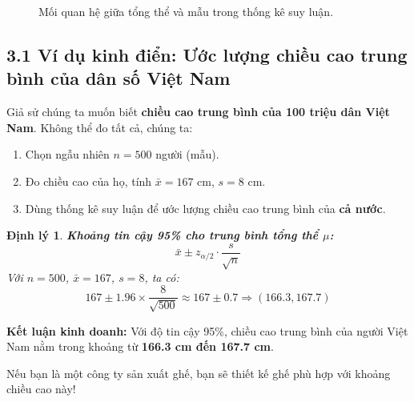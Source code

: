 \documentclass[a4paper,12pt]{article}
\newtheorem{theorem}{\color{theoremcolor}\bfseries Định lý}[section]
\theoremstyle{remark}
\begin{document}
\begin{figure}[H]
\centering
{}
\caption{Mối quan hệ giữa tổng thể và mẫu trong thống kê suy luận.}
\end{figure}

\subsection*{3.1 Ví dụ kinh điển: Ước lượng chiều cao trung bình của dân số Việt Nam}

Giả sử chúng ta muốn biết \textbf{chiều cao trung bình của 100 triệu dân Việt Nam}. Không thể đo tất cả, chúng ta:

\begin{enumerate}
    \item Chọn ngẫu nhiên \(n = 500\) người (mẫu).
    \item Đo chiều cao của họ, tính \(\bar{x} = 167\) cm, \(s = 8\) cm.
    \item Dùng thống kê suy luận để ước lượng chiều cao trung bình của \textbf{cả nước}.
\end{enumerate}

\begin{theorem}
\textbf{Khoảng tin cậy 95\% cho trung bình tổng thể \(\mu\):}
\[
\boxed{\bar{x} \pm z_{\alpha/2} \cdot \frac{s}{\sqrt{n}}}
\]
Với \(n = 500\), \(\bar{x} = 167\), \(s = 8\), ta có:
\[
167 \pm 1.96 \times \frac{8}{\sqrt{500}} \approx 167 \pm 0.7 \Rightarrow (166.3, 167.7)
\]
\end{theorem}

\begin{bizbox}
\textbf{Kết luận kinh doanh:} Với độ tin cậy 95\%, chiều cao trung bình của người Việt Nam nằm trong khoảng từ \textbf{166.3 cm đến 167.7 cm}. 

Nếu bạn là một công ty sản xuất ghế, bạn sẽ thiết kế ghế phù hợp với khoảng chiều cao này!
\end{bizbox}
\end{document}
